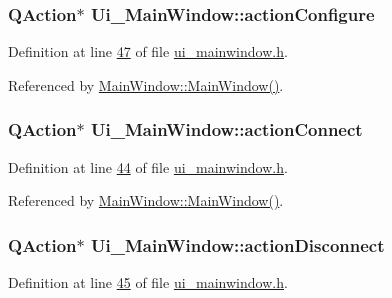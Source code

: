 \hypertarget{a00080_a3860abde3cfd3f6170e28fddde73f11e}{
\subsubsection[{action\+Configure}]{\setlength{\rightskip}{0pt plus 5cm}Q\+Action$\ast$ Ui\+\_\+\+Main\+Window\+::action\+Configure}}\label{a00080_a3860abde3cfd3f6170e28fddde73f11e}


Definition at line \hyperlink{a00139_source_l00047}{47} of file \hyperlink{a00139_source}{ui\+\_\+mainwindow.\+h}.



Referenced by \hyperlink{a00109_source_l00024}{Main\+Window\+::\+Main\+Window()}.

\hypertarget{a00080_aa0785566311fc48271690fb68b1d4c5f}{
\subsubsection[{action\+Connect}]{\setlength{\rightskip}{0pt plus 5cm}Q\+Action$\ast$ Ui\+\_\+\+Main\+Window\+::action\+Connect}}\label{a00080_aa0785566311fc48271690fb68b1d4c5f}


Definition at line \hyperlink{a00139_source_l00044}{44} of file \hyperlink{a00139_source}{ui\+\_\+mainwindow.\+h}.



Referenced by \hyperlink{a00109_source_l00024}{Main\+Window\+::\+Main\+Window()}.

\hypertarget{a00080_a8a16b3aef75b279eaaa887152d2f746b}{
\subsubsection[{action\+Disconnect}]{\setlength{\rightskip}{0pt plus 5cm}Q\+Action$\ast$ Ui\+\_\+\+Main\+Window\+::action\+Disconnect}}\label{a00080_a8a16b3aef75b279eaaa887152d2f746b}


Definition at line \hyperlink{a00139_source_l00045}{45} of file \hyperlink{a00139_source}{ui\+\_\+mainwindow.\+h}.



